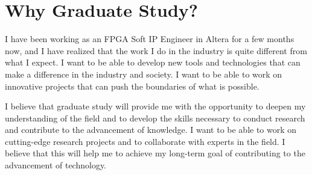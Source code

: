 \documentclass[a4 paper, 10pt]{article}
\begin{document}
\section*{Why Graduate Study?}
I have been working as an {FPGA Soft IP Engineer} in Altera for a few months now, and I have realized that the work I do in the industry is quite different from what I expect. I want to be able to develop {new tools and technologies} that can make a difference in the industry and society. I want to be able to work on {innovative projects} that can push the boundaries of what is possible.

I believe that graduate study will provide me with the opportunity to {deepen my understanding} of the field and to develop the skills necessary to conduct {research} and contribute to the {advancement of knowledge}. I want to be able to work on {cutting-edge research projects} and to collaborate with {experts in the field}. I believe that this will help me to achieve my long-term goal of contributing to the {advancement of technology}.

\end{document}
